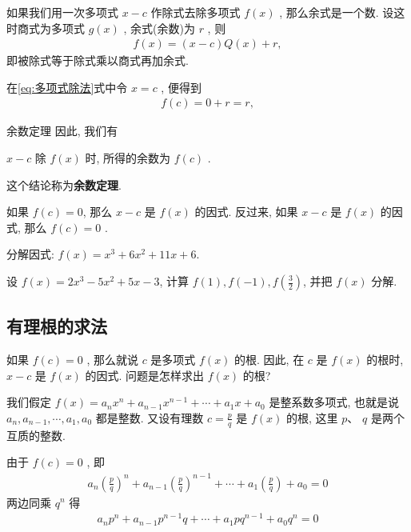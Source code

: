 \documentclass[aspectratio=169]{ctexbeamer}
\theoremstyle{definition}
\begin{document}
\begin{frame}
	如果我们用一次多项式 $x-c$ 作除式去除多项式 $f(x)$ , 那么余式是一个数. 设这时商式为多项式 $g(x)$ , 余式(余数)为 $r$ , 则
	\begin{align}\label{eq:多项式除法}
		f(x)=(x-c) Q(x)+r,
	\end{align}
	即被除式等于除式乘以商式再加余式.

	在\ref{eq:多项式除法}式中令 $x=c$ , 便得到
	\begin{align*}
		f(c)=0+r=r,
	\end{align*}
\end{frame}

\begin{frame}{余数定理}
	因此, 我们有
	\begin{center}
		$x-c$ 除 $f(x)$ 时, 所得的余数为 $f(c)$ .
	\end{center}
	这个结论称为\textbf{余数定理}.
	\begin{block}{}
		如果 $f(c)=0$, 那么 $x-c$ 是 $f(x)$ 的因式. 反过来, 如果 $x-c$ 是 $f(x)$ 的因式, 那么 $f(c)=0$ .
	\end{block}
\end{frame}

\begin{frame}[t]
	\begin{example}
		分解因式: $f(x)=x^{3}+6 x^{2}+11 x+6$.
	\end{example}
\end{frame}

\begin{frame}[t]
	\begin{example}
		设 $f(x)=2 x^{3}-5 x^{2}+5 x-3$, 计算 $f(1), f(-1), f\left(\frac{3}{2}\right)$, 并把 $f(x)$ 分解.
	\end{example}
\end{frame}

\subsection{有理根的求法}
\begin{frame}
	如果 $f(c)=0$ , 那么就说 $c$ 是多项式 $f(x)$ 的根. 因此, 在 $c$ 是 $f(x)$ 的根时,  $x-c$ 是 $f(x)$ 的因式. 问题是怎样求出 $f(x)$ 的根?

	我们假定 $f(x)=a_{n} x^{n}+a_{n-1} x^{n-1}+\cdots+a_{1} x+a_{0}$ 是整系数多项式, 也就是说 $a_{n}, a_{n-1}, \cdots, a_{1}, a_{0}$ 都是整数. 又设有理数 $c=\frac{p}{q}$ 是 $f(x)$ 的根, 这里 $p 、$ $q$ 是两个互质的整数.

	由于 $f(c)=0$ , 即
	\begin{align*}
		a_{n}\left(\frac{p}{q}\right)^{n}+a_{n-1}\left(\frac{p}{q}\right)^{n-1}+\cdots+a_{1}\left(\frac{p}{q}\right)+a_{0}=0
	\end{align*}
	两边同乘 $q^{n}$ 得
	\begin{align}\label{eq:有理根}
		a_{n} p^{n}+a_{n-1} p^{n-1} q+\cdots+a_{1} p q^{n-1}+a_{0} q^{n}=0
	\end{align}
\end{frame}
\end{document}
